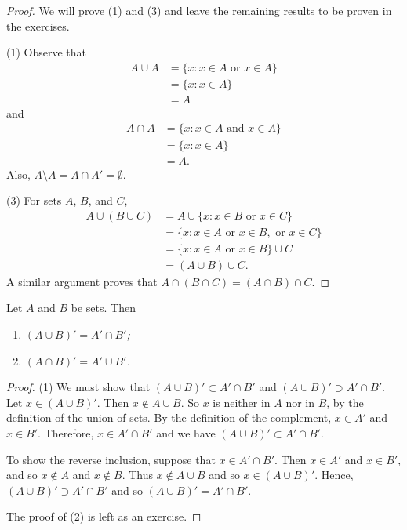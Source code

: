 \begin{proof}
We will prove (1) and (3) and leave the remaining results to be proven in the exercises. 

(1)
Observe that
\begin{align*}
A \cup A & =  \{ x :  x \in A \text{ or } x \in A \} \\
& =  \{ x : x \in A \} \\
& =  A
\end{align*}
and
\begin{align*}
A \cap A & =  \{ x : x \in A \text{ and } x \in A \} \\
& =  \{ x : x \in A  \} \\
& =  A.
\end{align*}
Also, $A \setminus A = A \cap A' = \emptyset$.
 
(3)
For sets $A$, $B$, and $C$,
\begin{align*}
A \cup (B \cup C)
& =
A \cup \{ x : x \in B \text{ or } x \in C \} \\
& =
\{ x : x \in A \text{ or } x \in B, \text{ or } x \in C \} \\
& =
\{ x : x \in A \text{ or } x \in B \} \cup C \\
& =
(A \cup B) \cup C.
\end{align*}
A  similar argument proves that  $A \cap (B \cap C) = (A \cap B) \cap
C$. 
\end{proof}

\begin{theorem}
Let $A$ and $B$ be sets. Then 
\begin{enumerate}
 
\rm\item\it
$(A \cup B)' = A' \cap B'$; 
 
\rm\item\it
$(A \cap B)' = A' \cup B'$.
 
\end{enumerate}
\end{theorem}
 
\begin{proof}
(1) 
We must show that $(A \cup B)' \subset A' \cap B'$ and $(A \cup B)' \supset A' \cap B'$. Let $x \in (A \cup B)'$.  Then $x \notin A \cup B$. So $x$ is neither in $A$ nor in $B$, by the definition of the union of sets.  By the definition of the complement, $x \in A'$ and $x \in B'$.  Therefore, $x \in A' \cap B'$ and we have $(A \cup B)' \subset A' \cap B'$.
 
To show the reverse inclusion, suppose that $x \in A' \cap B'$.  Then $x \in A'$ and $x \in B'$, and so $x \notin A$ and $x \notin B$.  Thus $x \notin A \cup B$ and so $x \in (A \cup B)'$.  Hence, $(A \cup B)' \supset A' \cap B'$ and so $(A \cup B)' = A' \cap B'$. 

The proof of (2) is left as an exercise.
\end{proof}
 
